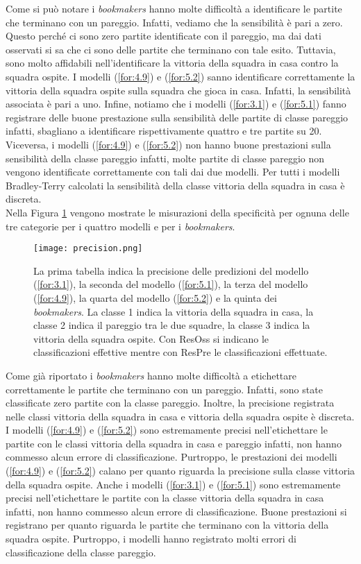 Come si può notare i \emph{bookmakers} hanno molte difficoltà a identificare le partite che terminano con un pareggio. Infatti, vediamo che la sensibilità è pari a zero. Questo perché ci sono zero partite identificate con il pareggio, ma dai dati osservati si sa che ci sono delle partite che terminano con tale esito. Tuttavia, sono molto affidabili nell’identificare la vittoria della squadra in casa contro la squadra ospite. I modelli (\ref{for:4.9}) e (\ref{for:5.2}) sanno identificare correttamente la vittoria della squadra ospite sulla squadra che gioca in casa. Infatti, la sensibilità associata è pari a uno. Infine, notiamo che i modelli (\ref{for:3.1}) e (\ref{for:5.1}) fanno registrare delle buone prestazione sulla sensibilità delle partite di classe pareggio infatti, sbagliano a identificare rispettivamente quattro e tre partite su 20. Viceversa, i modelli (\ref{for:4.9}) e (\ref{for:5.2}) non hanno buone prestazioni sulla sensibilità della classe pareggio infatti, molte partite di classe pareggio non vengono identificate correttamente con tali dai due modelli. Per tutti i modelli Bradley-Terry calcolati la sensibilità della classe vittoria della squadra in casa è discreta.\\ 
Nella Figura \ref{fig:precision} vengono mostrate le misurazioni della specificità per ognuna delle tre categorie per i quattro modelli e per i \emph{bookmakers}.
\begin{figure}[]
	\begin{center}
		\texttt{[image: precision.png]}
		\caption{La prima tabella indica la precisione delle predizioni del modello (\ref{for:3.1}), la seconda del modello (\ref{for:5.1}), la terza del modello (\ref{for:4.9}), la quarta del modello (\ref{for:5.2}) e la quinta dei \emph{bookmakers}. La classe 1 indica la vittoria della squadra in casa, la classe 2 indica il pareggio tra le due squadre, la classe 3 indica la vittoria della squadra ospite. Con \textsf{ResOss} si indicano le classificazioni effettive mentre con \textsf{ResPre} le classificazioni effettuate.}\label{fig:precision}
	\end{center}
\end{figure}
Come già riportato i \emph{bookmakers} hanno molte difficoltà a etichettare correttamente le partite che terminano con un pareggio. Infatti, sono state classificate zero partite con la classe pareggio. Inoltre, la precisione registrata nelle classi vittoria della squadra in casa e vittoria della squadra ospite è discreta. I modelli (\ref{for:4.9}) e (\ref{for:5.2})
sono estremamente precisi nell'etichettare le partite con le classi vittoria della squadra in casa e pareggio infatti, non hanno commesso alcun errore di classificazione. Purtroppo, le prestazioni dei modelli (\ref{for:4.9}) e (\ref{for:5.2}) calano per quanto riguarda la precisione sulla classe vittoria della squadra ospite. Anche i modelli (\ref{for:3.1}) e (\ref{for:5.1}) sono estremamente precisi nell'etichettare le partite con la classe vittoria della squadra in casa infatti, non hanno commesso alcun errore di classificazione. Buone prestazioni si registrano per quanto riguarda le partite che terminano con la vittoria della squadra ospite. Purtroppo, i modelli hanno registrato molti errori di classificazione della classe pareggio.\\ 
